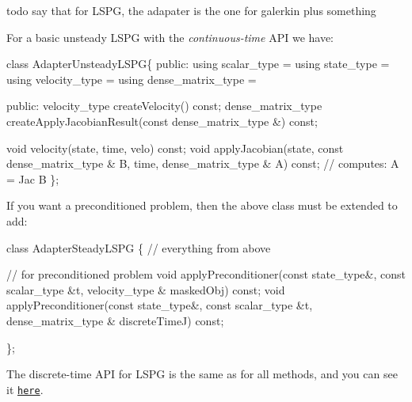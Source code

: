 todo say that for L\+S\+PG, the adapater is the one for galerkin plus something

For a basic unsteady L\+S\+PG with the {\itshape continuous-\/time} A\+PI we have\+:

 
\begin{DoxyCode}
\textcolor{keyword}{class }AdapterUnsteadyLSPG\{
\textcolor{keyword}{public}:
  \textcolor{keyword}{using} scalar\_type =
  \textcolor{keyword}{using} state\_type =
  \textcolor{keyword}{using} velocity\_type =
  \textcolor{keyword}{using} dense\_matrix\_type =

\textcolor{keyword}{public}:
  velocity\_type createVelocity() \textcolor{keyword}{const};
  dense\_matrix\_type createApplyJacobianResult(\textcolor{keyword}{const} dense\_matrix\_type &) \textcolor{keyword}{const};

  \textcolor{keywordtype}{void} velocity(state, time, velo) \textcolor{keyword}{const};
  \textcolor{keywordtype}{void} applyJacobian(state, \textcolor{keyword}{const} dense\_matrix\_type & B, time, dense\_matrix\_type & A) \textcolor{keyword}{const}; \textcolor{comment}{// computes: A
       = Jac B}
\};
\end{DoxyCode}
 

If you want a preconditioned problem, then the above class must be extended to add\+:  
\begin{DoxyCode}
\textcolor{keyword}{class }AdapterSteadyLSPG
\{
  \textcolor{comment}{// everything from above}

  \textcolor{comment}{// for preconditioned problem}
  \textcolor{keywordtype}{void} applyPreconditioner(\textcolor{keyword}{const} state\_type&, \textcolor{keyword}{const} scalar\_type &t, velocity\_type & maskedObj) \textcolor{keyword}{const};
  \textcolor{keywordtype}{void} applyPreconditioner(\textcolor{keyword}{const} state\_type&, \textcolor{keyword}{const} scalar\_type &t, dense\_matrix\_type & discreteTimeJ) \textcolor{keyword}{
      const};

\};
\end{DoxyCode}
 

The discrete-\/time A\+PI for L\+S\+PG is the same as for all methods, and you can see it \href{./md_pages_adapter_apis_adapter_discrete_time_api.html}{\tt here}. 